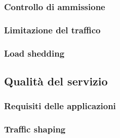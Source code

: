 \documentclass{article}
\begin{document}
\subsubsection{Controllo di ammissione}
\subsubsection{Limitazione del traffico}
\subsubsection{Load shedding}
\subsection{Qualità del servizio}
\subsubsection{Requisiti delle applicazioni}
\subsubsection{Traffic shaping}
\end{document}
